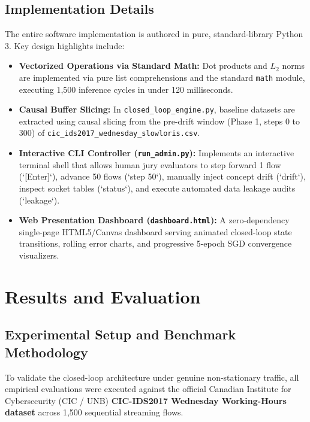 \documentclass[12pt,a4paper,oneside]{report}
\begin{document}
\section{Implementation Details}
The entire software implementation is authored in pure, standard-library Python 3. Key design highlights include:
\begin{itemize}
    \item \textbf{Vectorized Operations via Standard Math:} Dot products and $L_2$ norms are implemented via pure list comprehensions and the standard \texttt{math} module, executing 1,500 inference cycles in under 120 milliseconds.
    \item \textbf{Causal Buffer Slicing:} In \texttt{closed\_loop\_engine.py}, baseline datasets are extracted using causal slicing from the pre-drift window (Phase 1, steps 0 to 300) of \texttt{cic\_ids2017\_wednesday\_slowloris.csv}.
    \item \textbf{Interactive CLI Controller (\texttt{run\_admin.py}):} Implements an interactive terminal shell that allows human jury evaluators to step forward 1 flow (`[Enter]`), advance 50 flows (`step 50`), manually inject concept drift (`drift`), inspect socket tables (`status`), and execute automated data leakage audits (`leakage`).
    \item \textbf{Web Presentation Dashboard (\texttt{dashboard.html}):} A zero-dependency single-page HTML5/Canvas dashboard serving animated closed-loop state transitions, rolling error charts, and progressive 5-epoch SGD convergence visualizers.
\end{itemize}


\chapter{Results and Evaluation}
\label{chap:results}

\section{Experimental Setup and Benchmark Methodology}
To validate the closed-loop architecture under genuine non-stationary traffic, all empirical evaluations were executed against the official Canadian Institute for Cybersecurity (CIC / UNB) \textbf{CIC-IDS2017 Wednesday Working-Hours dataset} across 1,500 sequential streaming flows.
\end{document}
